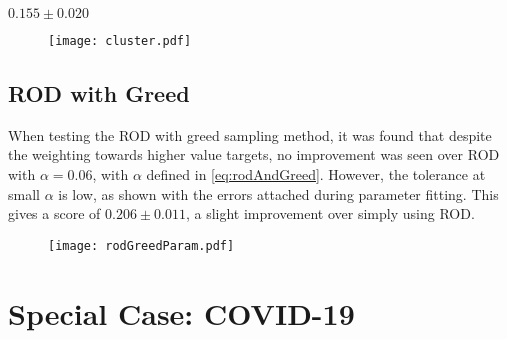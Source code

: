 ${0.155\pm{}0.020}$

\begin{figure}[h]
    \begin{center}
        \texttt{[image: cluster.pdf]}
    \end{center}
\end{figure}
\subsection{ROD with Greed}
When testing the ROD with greed sampling method, it was found that despite the weighting towards higher value targets, no improvement was seen over ROD with $\alpha{}=0.06$, with $\alpha$ defined in \ref{eq:rodAndGreed}. However, the tolerance at small $\alpha$ is low, as shown with the errors attached during parameter fitting. This gives a score of ${0.206\pm{}0.011}$, a slight improvement over simply using ROD.

\begin{figure}[h]
    \begin{center}
        \texttt{[image: rodGreedParam.pdf]}
    \end{center}
\end{figure}

\section{Special Case: COVID-19}